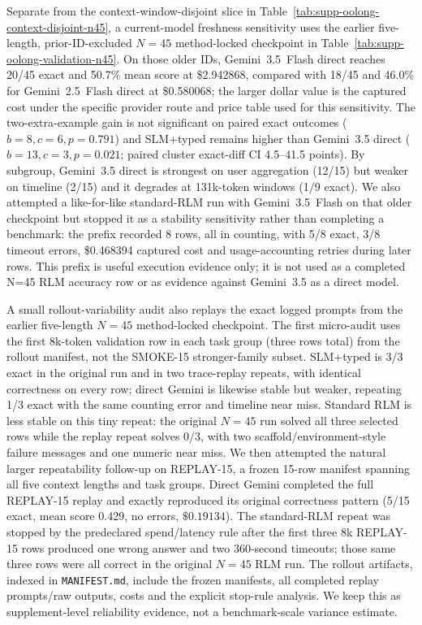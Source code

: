 \documentclass[letterpaper]{article}
\begin{document}
Separate from the context-window-disjoint slice in Table~\ref{tab:supp-oolong-context-disjoint-n45}, a current-model freshness sensitivity uses the earlier five-length, prior-ID-excluded $N{=}45$ method-locked checkpoint in Table~\ref{tab:supp-oolong-validation-n45}. On those older IDs, Gemini~3.5~Flash direct reaches 20/45 exact and 50.7\% mean score at \$2.942868, compared with 18/45 and 46.0\% for Gemini~2.5~Flash direct at \$0.580068; the larger dollar value is the captured cost under the specific provider route and price table used for this sensitivity. The two-extra-example gain is not significant on paired exact outcomes ($b{=}8,c{=}6,p{=}0.791$) and SLM+typed remains higher than Gemini~3.5 direct ($b{=}13,c{=}3,p{=}0.021$; paired cluster exact-diff CI 4.5--41.5 points). By subgroup, Gemini~3.5 direct is strongest on user aggregation (12/15) but weaker on timeline (2/15) and it degrades at 131k-token windows (1/9 exact). We also attempted a like-for-like standard-RLM run with Gemini~3.5~Flash on that older checkpoint but stopped it as a stability sensitivity rather than completing a benchmark: the prefix recorded 8 rows, all in counting, with 5/8 exact, 3/8 timeout errors, \$0.468394 captured cost and usage-accounting retries during later rows. This prefix is useful execution evidence only; it is not used as a completed N=45 RLM accuracy row or as evidence against Gemini~3.5 as a direct model.

A small rollout-variability audit also replays the exact logged prompts from the earlier five-length $N=45$ method-locked checkpoint. The first micro-audit uses the first 8k-token validation row in each task group (three rows total) from the rollout manifest, not the SMOKE-15 stronger-family subset. SLM+typed is 3/3 exact in the original run and in two trace-replay repeats, with identical correctness on every row; direct Gemini is likewise stable but weaker, repeating 1/3 exact with the same counting error and timeline near miss. Standard RLM is less stable on this tiny repeat: the original $N=45$ run solved all three selected rows while the replay repeat solves 0/3, with two scaffold/environment-style failure messages and one numeric near miss. We then attempted the natural larger repeatability follow-up on REPLAY-15, a frozen 15-row manifest spanning all five context lengths and task groups. Direct Gemini completed the full REPLAY-15 replay and exactly reproduced its original correctness pattern (5/15 exact, mean score 0.429, no errors, $\$0.19134$). The standard-RLM repeat was stopped by the predeclared spend/latency rule after the first three 8k REPLAY-15 rows produced one wrong answer and two 360-second timeouts; those same three rows were all correct in the original $N=45$ RLM run. The rollout artifacts, indexed in \texttt{MANIFEST.md}, include the frozen manifests, all completed replay prompts/raw outputs, costs and the explicit stop-rule analysis. We keep this as supplement-level reliability evidence, not a benchmark-scale variance estimate.
\end{document}
